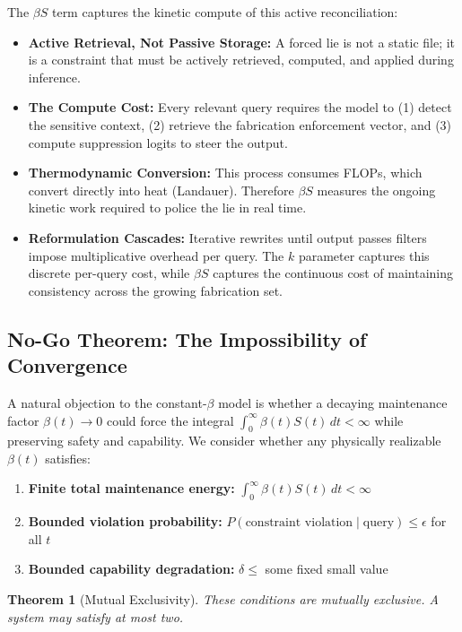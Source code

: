 \documentclass[11pt,a4paper]{article}
\newtheorem{theorem}{Theorem}
\begin{document}
The $\beta S$ term captures the kinetic compute of this active reconciliation:
\begin{itemize}
    \item \textbf{Active Retrieval, Not Passive Storage:} A forced lie is not a static file; it is a constraint that must be actively retrieved, computed, and applied during inference.
    \item \textbf{The Compute Cost:} Every relevant query requires the model to (1) detect the sensitive context, (2) retrieve the fabrication enforcement vector, and (3) compute suppression logits to steer the output.
    \item \textbf{Thermodynamic Conversion:} This process consumes FLOPs, which convert directly into heat (Landauer). Therefore $\beta S$ measures the ongoing kinetic work required to police the lie in real time.
    \item \textbf{Reformulation Cascades:} Iterative rewrites until output passes filters impose multiplicative overhead per query. The $k$ parameter captures this discrete per-query cost, while $\beta S$ captures the continuous cost of maintaining consistency across the growing fabrication set.
\end{itemize}

\subsection{No-Go Theorem: The Impossibility of Convergence}
A natural objection to the constant-$\beta$ model is whether a decaying maintenance factor $\beta(t) \to 0$ could force the integral $\int_0^\infty \beta(t) S(t)\, dt < \infty$ while preserving safety and capability. We consider whether any physically realizable $\beta(t)$ satisfies:

\begin{enumerate}
    \item \textbf{Finite total maintenance energy:} $\int_0^\infty \beta(t) S(t)\, dt < \infty$
    \item \textbf{Bounded violation probability:} $P(\text{constraint violation} \mid \text{query}) \le \epsilon$ for all $t$
    \item \textbf{Bounded capability degradation:} $\delta \le$ some fixed small value
\end{enumerate}

\begin{theorem}[Mutual Exclusivity]
These conditions are mutually exclusive. A system may satisfy at most two.
\end{theorem}
\end{document}
